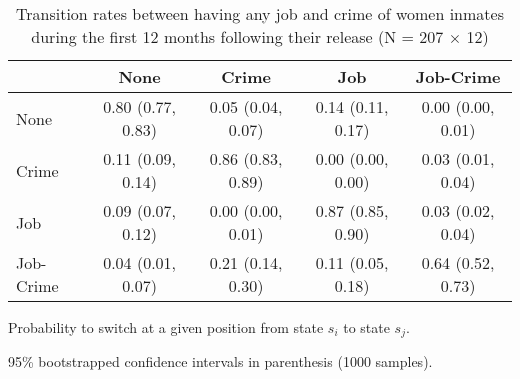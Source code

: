 \begin{table}[htp]
\scriptsize
\setlength{\tabcolsep}{10pt}
\renewcommand{\arraystretch}{1.3}
\begin{threeparttable}
\centering
\caption{Transition rates between having any job and crime of women inmates \newline
    during the first 12 months following their release (N = 207 $\times$ 12)} 
\label{tab:transition_rates_anyjob_crime}
\begin{tabular}{lcccc}
  \hline
 & None & Crime & Job & Job-Crime \\ 
  \hline
None & 0.80 (0.77, 0.83) & 0.05 (0.04, 0.07) & 0.14 (0.11, 0.17) & 0.00 (0.00, 0.01) \\ 
  Crime & 0.11 (0.09, 0.14) & 0.86 (0.83, 0.89) & 0.00 (0.00, 0.00) & 0.03 (0.01, 0.04) \\ 
  Job & 0.09 (0.07, 0.12) & 0.00 (0.00, 0.01) & 0.87 (0.85, 0.90) & 0.03 (0.02, 0.04) \\ 
  Job-Crime & 0.04 (0.01, 0.07) & 0.21 (0.14, 0.30) & 0.11 (0.05, 0.18) & 0.64 (0.52, 0.73) \\ 
   \hline
\end{tabular}
\begin{tablenotes}
\scriptsize
\item Probability to switch at a given position from state $s_i$ to state $s_j$. 
    \item 95\% bootstrapped confidence intervals in parenthesis (1000 samples).
\end{tablenotes}
\end{threeparttable}
\end{table}
